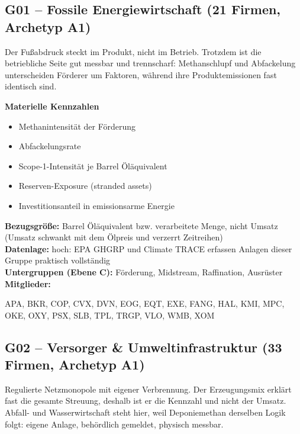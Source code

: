 \subsection*{G01 -- Fossile Energiewirtschaft \normalfont\small (21 Firmen, Archetyp A1)}
\noindent Der Fußabdruck steckt im Produkt, nicht im Betrieb. Trotzdem ist die betriebliche Seite gut messbar und trennscharf: Methanschlupf und Abfackelung unterscheiden Förderer um Faktoren, während ihre Produktemissionen fast identisch sind.

\noindent\textbf{Materielle Kennzahlen}
\begin{itemize}[nosep,leftmargin=1.2em]
  \item Methanintensität der Förderung
  \item Abfackelungsrate
  \item Scope-1-Intensität je Barrel Öläquivalent
  \item Reserven-Exposure (stranded assets)
  \item Investitionsanteil in emissionsarme Energie
\end{itemize}
\noindent\textbf{Bezugsgröße:} Barrel Öläquivalent bzw. verarbeitete Menge, nicht Umsatz (Umsatz schwankt mit dem Ölpreis und verzerrt Zeitreihen)\\
\textbf{Datenlage:} hoch: EPA GHGRP und Climate TRACE erfassen Anlagen dieser Gruppe praktisch vollständig\\
\textbf{Untergruppen (Ebene C):} Förderung, Midstream, Raffination, Ausrüster\\
\textbf{Mitglieder:} {\raggedright\small\ttfamily APA, BKR, COP, CVX, DVN, EOG, EQT, EXE, FANG, HAL, KMI, MPC, OKE, OXY, PSX, SLB, TPL, TRGP, VLO, WMB, XOM\par}

\medskip
\subsection*{G02 -- Versorger \& Umweltinfrastruktur \normalfont\small (33 Firmen, Archetyp A1)}
\noindent Regulierte Netzmonopole mit eigener Verbrennung. Der Erzeugungsmix erklärt fast die gesamte Streuung, deshalb ist er die Kennzahl und nicht der Umsatz. Abfall- und Wasserwirtschaft steht hier, weil Deponiemethan derselben Logik folgt: eigene Anlage, behördlich gemeldet, physisch messbar.

